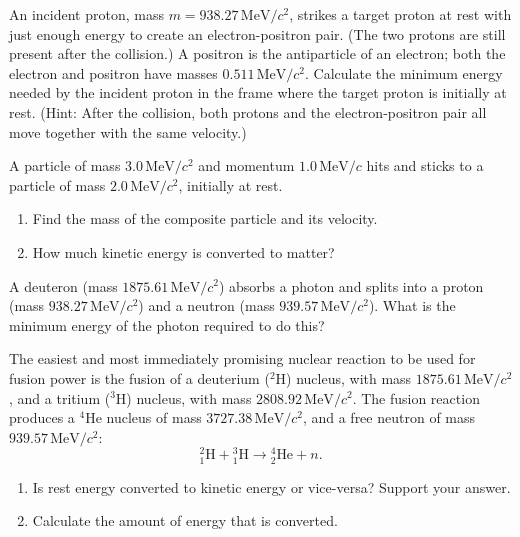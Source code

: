 \begin{exercise}
  An incident proton, mass $m = 938.27\,\text{MeV}/c^2$, strikes a
  target proton at rest with just enough energy to create an
  electron-positron pair.  (The two protons are still present after
  the collision.)  A positron is the antiparticle of an electron; both
  the electron and positron have masses $0.511\,\text{MeV}/c^2$.
  Calculate the minimum energy needed by the incident proton in the
  frame where the target proton is initially at rest. (Hint: After the
  collision, both protons and the electron-positron pair all move
  together with the same velocity.)
\label{prob:pair_creation}
\end{exercise}

\begin{exercise}
  A particle of mass $3.0\,\text{MeV}/c^2$ and momentum
  $1.0\,\text{MeV}/c$ hits and sticks to a particle of mass
  $2.0\,\text{MeV}/c^2$, initially at rest.
  \begin{enumerate}
  \item Find the mass of the composite particle and its velocity.
  \item How much kinetic energy is converted to matter?
  \end{enumerate}
\label{prob:composite}
\end{exercise}

\begin{exercise}
  A deuteron (mass $1875.61\,\text{MeV}/c^2$) absorbs a photon and
  splits into a proton (mass $938.27\,\text{MeV}/c^2$) and a neutron
  (mass $939.57\,\text{MeV}/c^2$).  What is the minimum energy of the
  photon required to do this?
  \label{prob:deuteron}
\end{exercise}


\begin{exercise}
The easiest and most immediately promising nuclear reaction to be used for
fusion power is the fusion of a deuterium ($^2$H) nucleus, with mass 
$1875.61\,\text{MeV}/c^2$, and a tritium ($^3$H) nucleus, with mass 
$2808.92\,\text{MeV}/c^2$.  The fusion reaction produces a $^4$He
nucleus of mass $3727.38\,\text{MeV}/c^2$,  and a free neutron of 
mass $939.57\,\text{MeV}/c^2$:
\[ {^2_1\mbox{H}} + {^3_1\mbox{H}} \rightarrow  {^4_2\mbox{He}} + n.\]
\begin{enumerate}
\item Is rest energy converted to kinetic energy or vice-versa?
Support your answer.
\item Calculate the amount of energy that is converted.
\end{enumerate}
\label{prob:fusion}
\end{exercise}




